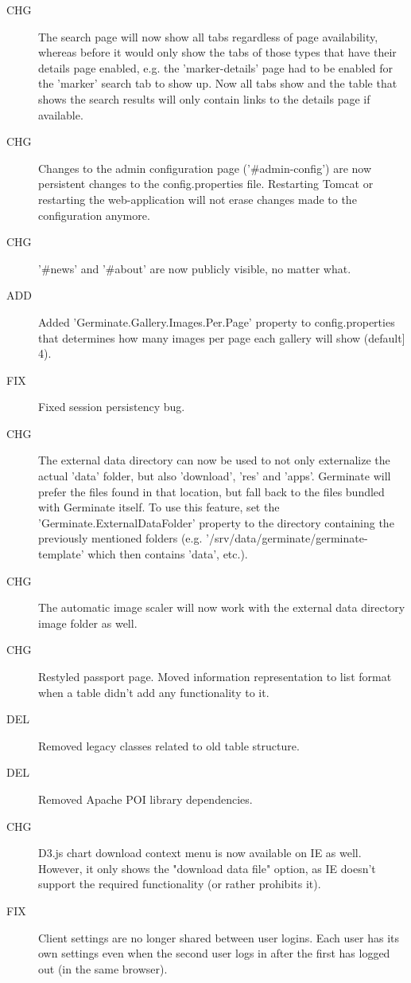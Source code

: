 \begin{description}
	\item[CHG] The search page will now show all tabs regardless of page availability, whereas before it would only show the tabs of those types that have their details page enabled, e.g. the 'marker-details' page had to be enabled for the 'marker' search tab to show up. Now all tabs show and the table that shows the search results will only contain links to the details page if available.
	\item[CHG] Changes to the admin configuration page ('\#admin-config') are now persistent changes to the config.properties file. Restarting Tomcat or restarting the web-application will not erase changes made to the configuration anymore.
	\item[CHG] '\#news' and '\#about' are now publicly visible, no matter what.
	\item[ADD] Added 'Germinate.Gallery.Images.Per.Page' property to config.properties that determines how many images per page each gallery will show (default] 4).
	\item[FIX] Fixed session persistency bug.
	\item[CHG] The external data directory can now be used to not only externalize the actual 'data' folder, but also 'download', 'res' and 'apps'. Germinate will prefer the files found in that location, but fall back to the files bundled with Germinate itself. To use this feature, set the 'Germinate.ExternalDataFolder' property to the directory containing the previously mentioned folders (e.g. '/srv/data/germinate/germinate-template' which then contains 'data', etc.).
	\item[CHG] The automatic image scaler will now work with the external data directory image folder as well.
	\item[CHG] Restyled passport page. Moved information representation to list format when a table didn't add any functionality to it.
	\item[DEL] Removed legacy classes related to old table structure.
	\item[DEL] Removed Apache POI library dependencies.
	\item[CHG] D3.js chart download context menu is now available on IE as well. However, it only shows the "download data file" option, as IE doesn't support the required functionality (or rather prohibits it).
	\item[FIX] Client settings are no longer shared between user logins. Each user has its own settings even when the second user logs in after the first has logged out (in the same browser).

\end{description}
